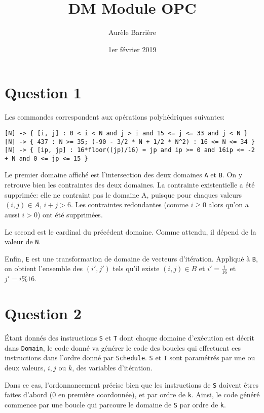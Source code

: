 \documentclass{article}
\title{DM Module OPC}
\author{Aur\`ele Barri\`ere}
\date{1er février 2019}
\begin{document}
\maketitle
\vspace{1cm}

\section*{Question 1}
Les commandes correspondent aux opérations polyhédriques suivantes:
\begin{lstlisting}
[N] -> { [i, j] : 0 < i < N and j > i and 15 <= j <= 33 and j < N }
[N] -> { 437 : N >= 35; (-90 - 3/2 * N + 1/2 * N^2) : 16 <= N <= 34 }
[N] -> { [ip, jp] : 16*floor((jp)/16) = jp and ip >= 0 and 16ip <= -2 + N and 0 <= jp <= 15 }
\end{lstlisting}

Le premier domaine affiché est l'intersection des deux domaines \lstinline{A} et \lstinline{B}.
On y retrouve bien les contraintes des deux domaines. La contrainte existentielle a été supprimée: elle ne contraint pas le domaine A, puisque pour chaques valeurs $(i,j)\in A$, $i+j>6$. Les contraintes redondantes (comme $i\geq 0$ alors qu'on a aussi $i>0$) ont été supprimées.

Le second est le cardinal du précédent domaine. Comme attendu, il dépend de la valeur de \lstinline{N}.

Enfin, \lstinline{E} est une transformation de domaine de vecteurs d'itération.
Appliqué à \lstinline{B}, on obtient l'ensemble des $(i',j')$ tels qu'il existe $(i,j)\in B$ et $i'=\frac{i}{16}$ et $j'=i\% 16$.

\section*{Question 2}

Étant donnés des instructions \lstinline{S} et \lstinline{T} dont chaque domaine d'exécution est décrit dans \lstinline{Domain}, le code donné va générer le code des boucles qui effectuent ces instructions dans l'ordre donné par \lstinline{Schedule}. \lstinline{S} et \lstinline{T} sont paramétrés par une ou deux valeurs, $i,j$ ou $k$, des variables d'itération.

Dans ce cas, l'ordonnancement précise bien que les instructions de \lstinline{S} doivent êtres faites d'abord (0 en première coordonnée), et par ordre de \lstinline{k}.
Ainsi, le code généré commence par une boucle qui parcoure le domaine de \lstinline{S} par ordre de \lstinline{k}.
\end{document}
